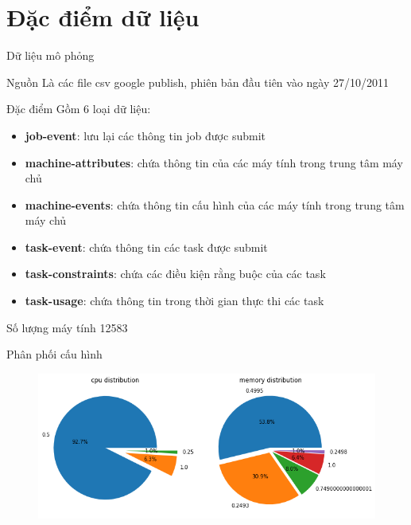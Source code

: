 \documentclass[10pt,xcolor={dvipsnames}]{beamer}
\begin{document}
	\section{Đặc điểm dữ liệu}
	
	\begin{frame}
	{Dữ liệu mô phỏng} 
	\begin{block}
	{Nguồn}
	Là các file csv google publish, phiên bản đầu tiên vào ngày 27/10/2011
	\end{block}
	\begin{block}
	{Đặc điểm}
	Gồm 6 loại dữ liệu: 
	\begin{itemize}
		\item \textbf{job-event}: lưu lại các thông tin job được submit 
		\item \textbf{machine-attributes}: chứa thông tin của các máy tính trong trung tâm máy chủ 
		\item \textbf{machine-events}: chứa thông tin cấu hình của các máy tính trong trung tâm máy chủ 
		\item \textbf{task-event}: chứa thông tin các task được submit 
		\item \textbf{task-constraints}: chứa các điều kiện rằng buộc của các task
		\item \textbf{task-usage}: chứa thông tin trong thời gian thực thi các task 
	\end{itemize}
	\end{block}
	\end{frame}
	
	\begin{frame}
		\begin{block}
		{Số lượng máy tính} 12583
		\end{block}
		\begin{block}
		{Phân phối cấu hình}
		\begin{figure}
			\centering
			\includegraphics[scale=0.35]{images/machine_attributes.png}
		\end{figure}
		\end{block}
	\end{frame}
	
\end{document}
